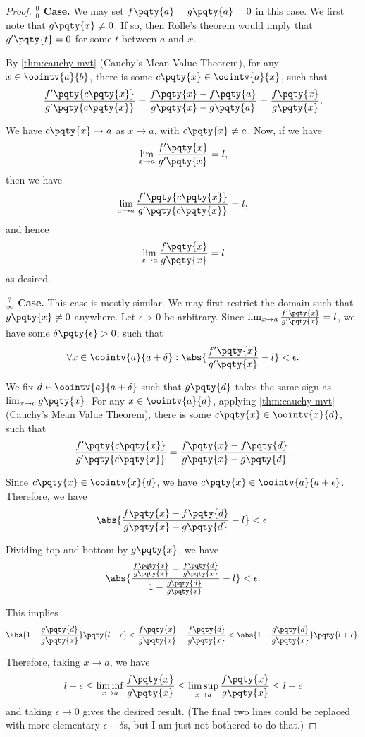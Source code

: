 \begin{proof}
    \textbf{\(\frac{0}{0}\) Case.} We may set \(f\pqty{a} = g\pqty{a} = 0\) in this case. We first note that \(g\pqty{x} \neq 0\). If so, then Rolle's theorem would imply that \(g'\pqty{t} = 0\) for some \(t\) between \(a\) and \(x\).

    By \autoref{thm:cauchy-mvt} (Cauchy's Mean Value Theorem), for any \(x \in \oointv{a}{b}\), there is some \(c\pqty{x} \in \oointv{a}{x}\), such that
    \[
        \frac{f'\pqty{c\pqty{x}}}{g'\pqty{c\pqty{x}}} = \frac{f\pqty{x} - f\pqty{a}}{g\pqty{x} - g\pqty{a}} = \frac{f\pqty{x}}{g\pqty{x}}.
    \]

    We have \(c\pqty{x} \to a\) as \(x \to a\), with \(c\pqty{x} \neq a\). Now, if we have
    \[
        \lim_{x \to a} \frac{f'\pqty{x}}{g'\pqty{x}} = l,
    \]
    then we have
    \[
        \lim_{x \to a} \frac{f'\pqty{c\pqty{x}}}{g'\pqty{c\pqty{x}}} = l,
    \]
    and hence
    \[
        \lim_{x \to a} \frac{f\pqty{x}}{g\pqty{x}} = l
    \]
    as desired.

    \textbf{\(\frac{?}{\infty}\) Case.} This case is mostly similar. We may first restrict the domain such that \(g\pqty{x} \neq 0\) anywhere. Let \(\epsilon > 0\) be arbitrary. Since \(\lim_{x \to a} \frac{f'\pqty{x}}{g'\pqty{x}} = l\), we have some \(\delta\pqty{\epsilon} > 0\), such that
    \[
        \forall x \in \oointv{a}{a + \delta}: \abs{\frac{f'\pqty{x}}{g'\pqty{x}} - l} < \epsilon.
    \]
    
    We fix \(d \in \oointv{a}{a + \delta}\) such that \(g\pqty{d}\) takes the same sign as \(\lim_{x \to a} g\pqty{x}\). For any \(x \in \oointv{a}{d}\), applying \autoref{thm:cauchy-mvt} (Cauchy's Mean Value Theorem), there is some \(c\pqty{x} \in \oointv{x}{d}\), such that
    \[
        \frac{f'\pqty{c\pqty{x}}}{g'\pqty{c\pqty{x}}} = \frac{f\pqty{x} - f\pqty{d}}{g\pqty{x} - g\pqty{d}}.
    \]

    Since \(c\pqty{x} \in \oointv{x}{d}\), we have \(c\pqty{x} \in \oointv{a}{a + \epsilon}\). Therefore, we have
    \[
        \abs{\frac{f\pqty{x} - f\pqty{d}}{g\pqty{x} - g\pqty{d}} - l} < \epsilon.
    \]

    Dividing top and bottom by \(g\pqty{x}\), we have
    \[
        \abs{\frac{\frac{f\pqty{x}}{g\pqty{x}} - \frac{f\pqty{d}}{g\pqty{x}}}{1 - \frac{g\pqty{d}}{g\pqty{x}}} - l} < \epsilon.
    \]

    This implies
    \[
        \abs{1 - \frac{g\pqty{d}}{g\pqty{x}}} \pqty{l - \epsilon} < \frac{f\pqty{x}}{g\pqty{x}} - \frac{f\pqty{d}}{g\pqty{x}} < \abs{1 - \frac{g\pqty{d}}{g\pqty{x}}} \pqty{l + \epsilon}.
    \]

    Therefore, taking \(x \to a\), we have
    \[
        l - \epsilon \leq \liminf_{x \to a} \frac{f\pqty{x}}{g\pqty{x}} \leq \limsup_{x \to a} \frac{f\pqty{x}}{g\pqty{x}} \leq l + \epsilon
    \]
    and taking \(\epsilon \to 0\) gives the desired result. (The final two lines could be replaced with more elementary \(\epsilon-\delta\)s, but I am just not bothered to do that.)
\end{proof}

